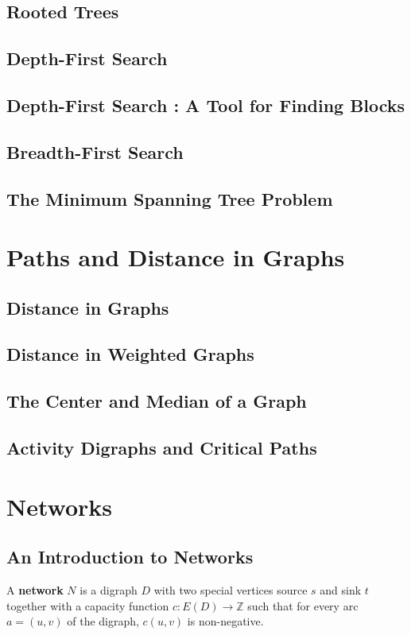 \section{Rooted Trees}
\section{Depth-First Search}
\section{Depth-First Search : A Tool for Finding Blocks}
\section{Breadth-First Search}
\section{The Minimum Spanning Tree Problem}

\chapter{Paths and Distance in Graphs}
\section{Distance in Graphs}
\section{Distance in Weighted Graphs}
\section{The Center and Median of a Graph}
\section{Activity Digraphs and Critical Paths}

\chapter{Networks}
\section{An Introduction to Networks}
\begin{definition}
	A \textbf{network} $N$ is a digraph $D$ with two special vertices source $s$ and sink $t$ together with a capacity function $c : E(D) \to \mathbb{Z}$ such that for every arc $a = (u,v)$ of the digraph, $c(u,v)$ is non-negative.
\end{definition}

